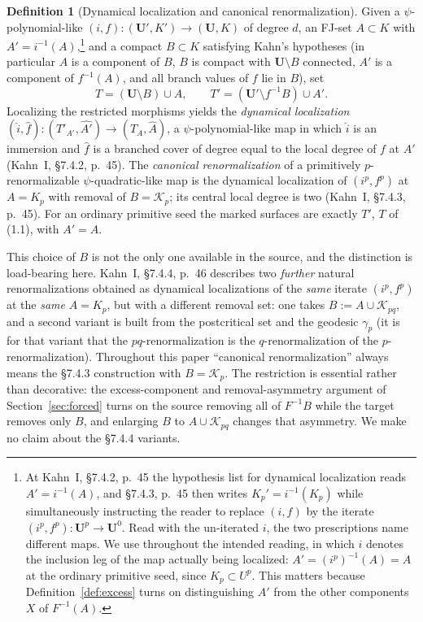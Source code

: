 \documentclass[11pt,reqno]{amsart}
\theoremstyle{definition}
\newtheorem{definition}[theorem]{Definition}
\theoremstyle{remark}
\begin{document}
\begin{definition}[Dynamical localization and canonical renormalization]\label{def:canonical}
Given a \(\psi\)-polynomial-like \((i,f)\colon(\mathbf U',K')\to(\mathbf U,K)\) of degree \(d\), an FJ-set \(A\subset K\) with \(A'=i^{-1}(A)\),\footnote{At Kahn~I, \S7.4.2, p.~45 the hypothesis list for dynamical localization reads \(A'=i^{-1}(A)\), and \S7.4.3, p.~45 then writes \(K_p'=i^{-1}(K_p)\) while simultaneously instructing the reader to replace \((i,f)\) by the iterate \((i^p,f^p)\colon\mathbf U^p\to\mathbf U^0\).  Read with the un-iterated \(i\), the two prescriptions name different maps.  We use throughout the intended reading, in which \(i\) denotes the inclusion leg of the map actually being localized: \(A'=(i^p)^{-1}(A)=A\) at the ordinary primitive seed, since \(K_p\subset U^p\).  This matters because Definition~\ref{def:excess} turns on distinguishing \(A'\) from the other components \(X\) of \(F^{-1}(A)\).} and a compact \(B\subset K\) satisfying Kahn's hypotheses (in particular \(A\) is a component of \(B\), \(B\) is compact with \(\mathbf U\setminus B\) connected, \(A'\) is a component of \(f^{-1}(A)\), and all branch values of \(f\) lie in \(B\)), set
\[
 T=(\mathbf U\setminus B)\cup A,\qquad T'=(\mathbf U'\setminus f^{-1}B)\cup A'.
\]
Localizing the restricted morphisms yields the \emph{dynamical localization} \((\widehat i,\widehat f)\colon(T'_{A'},\widehat{A'})\to(T_A,\widehat A)\), a \(\psi\)-polynomial-like map in which \(\widehat i\) is an immersion and \(\widehat f\) is a branched cover of degree equal to the local degree of \(f\) at \(A'\) (Kahn~I, \S7.4.2, p.~45).  The \emph{canonical renormalization} of a primitively \(p\)-renormalizable \(\psi\)-quadratic-like map is the dynamical localization of \((i^p,f^p)\) at \(A=K_p\) with removal of \(B=\mathcal K_p\); its central local degree is two (Kahn~I, \S7.4.3, p.~45).  For an ordinary primitive seed the marked surfaces are exactly \(T'\), \(T\) of (1.1), with \(A'=A\).

This choice of \(B\) is not the only one available in the source, and the distinction is load-bearing here.  Kahn~I, \S7.4.4, p.~46 describes two \emph{further} natural renormalizations obtained as dynamical localizations of the \emph{same} iterate \((i^p,f^p)\) at the \emph{same} \(A=K_p\), but with a different removal set: one takes \(B:=A\cup\mathcal K_{pq}\), and a second variant is built from the postcritical set and the geodesic \(\gamma_p\) (it is for that variant that the \(pq\)-renormalization is the \(q\)-renormalization of the \(p\)-renormalization).  Throughout this paper ``canonical renormalization'' always means the \S7.4.3 construction with \(B=\mathcal K_p\).  The restriction is essential rather than decorative: the excess-component and removal-asymmetry argument of Section~\ref{sec:forced} turns on the source removing all of \(F^{-1}B\) while the target removes only \(B\), and enlarging \(B\) to \(A\cup\mathcal K_{pq}\) changes that asymmetry.  We make no claim about the \S7.4.4 variants.
\end{definition}
\end{document}
